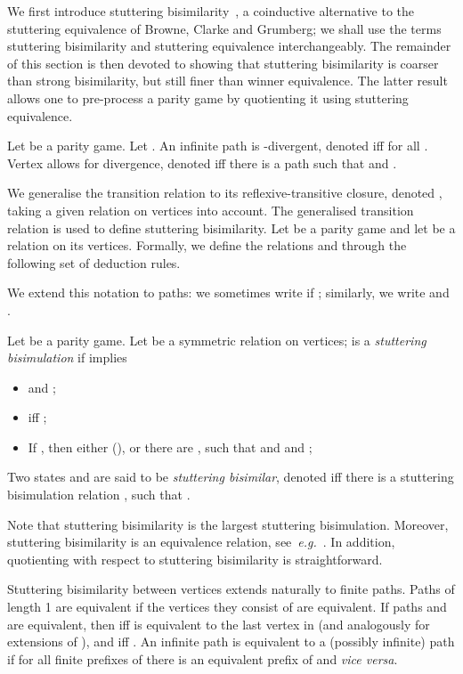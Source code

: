 \documentclass[a4paper]{llncs}
\newcommand{\eg}{\textit{e.g.}\xspace}
\begin{document}
We first introduce stuttering bisimilarity~\cite{dNV:95}, a coinductive
alternative to the stuttering equivalence of Browne, Clarke and Grumberg;
we shall use the terms stuttering bisimilarity and stuttering equivalence
interchangeably. The remainder of this section is then devoted to showing
that stuttering bisimilarity is coarser than strong bisimilarity, but
still finer than winner equivalence. The latter result allows one to
pre-process a parity game by quotienting it using stuttering equivalence.



\begin{definition} Let  be
a parity game. Let .
An infinite path  is -divergent, denoted  iff
 for all . Vertex  allows for
divergence, denoted  iff there is a path  such
that  and .
\end{definition}
We generalise the transition relation  to its reflexive-transitive
closure, denoted , taking a given relation  on
vertices into account. The generalised transition relation is used
to define stuttering bisimilarity.
Let  be a parity game
and let 
 be a relation on its vertices. Formally, we
define the relations  and  through the following set of deduction rules.

We extend this notation to paths: we sometimes write
 if ; similarly, we write 
 and .

\begin{definition}\label{def:stut}
  Let  be a parity game. Let  be a symmetric relation on vertices;  is a \emph{stuttering 
  bisimulation} if  implies
  \begin{itemize}
    \item  and ;
    \item  iff ;
    \item If , then either (), or
          there are , such that  and  and ;
  \end{itemize}
  Two states  and  are said to be \emph{stuttering bisimilar},
  denoted  iff there is a stuttering bisimulation relation , such that .
\end{definition}
Note that stuttering bisimilarity is the largest stuttering
bisimulation.  Moreover, stuttering bisimilarity is an equivalence relation,
see~\eg~\cite{dNV:95,BCG:88}. In addition, quotienting with respect to
stuttering bisimilarity is straightforward.

Stuttering bisimilarity between vertices extends naturally to finite
paths.  Paths of length 1 are equivalent if the vertices they consist of
are equivalent.  If paths  and  are equivalent, then  iff  is equivalent to the last vertex in 
(and analogously for extensions of ), and  iff .  An infinite path  is
equivalent to a (possibly infinite) path  if for all finite prefixes
of  there is an equivalent prefix of  and \emph{vice versa}.
\end{document}
